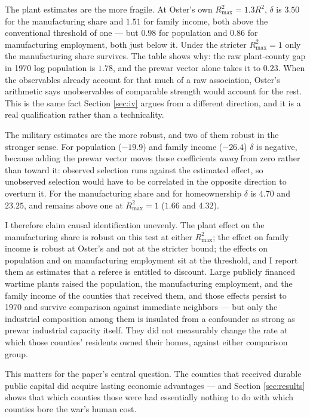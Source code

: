 \documentclass[12pt]{article}
\begin{document}
The plant estimates are the more fragile. At Oster's own $R^2_{\max}=1.3R^2$,
$\delta$ is $3.50$ for the manufacturing share and $1.51$ for family income,
both above the conventional threshold of one --- but $0.98$ for population and
$0.86$ for manufacturing employment, both just below it. Under the stricter
$R^2_{\max}=1$ only the manufacturing share survives. The table shows why: the
raw plant-county gap in 1970 log population is $1.78$, and the prewar vector
alone takes it to $0.23$. When the observables already account for that much of
a raw association, Oster's arithmetic says unobservables of comparable strength
would account for the rest. This is the same fact Section \ref{sec:iv} argues
from a different direction, and it is a real qualification rather than a
technicality.

The military estimates are the more robust, and two of them robust in the
stronger sense. For population ($-19.9$) and family income ($-26.4$) $\delta$ is
negative, because adding the prewar vector moves those coefficients \emph{away}
from zero rather than toward it: observed selection runs against the estimated
effect, so unobserved selection would have to be correlated in the opposite
direction to overturn it. For the manufacturing share and for homeownership
$\delta$ is $4.70$ and $23.25$, and remains above one at $R^2_{\max}=1$ ($1.66$
and $4.32$).

I therefore claim causal identification unevenly. The plant effect on the
manufacturing share is robust on this test at either $R^2_{\max}$; the effect on
family income is robust at Oster's and not at the stricter bound; the effects on
population and on manufacturing employment sit at the threshold, and I report
them as estimates that a referee is entitled to discount. Large publicly
financed wartime plants raised the population, the manufacturing employment, and
the family income of the counties that received them, and those effects persist
to 1970 and survive comparison against immediate neighbors --- but only the
industrial composition among them is insulated from a confounder as strong as
prewar industrial capacity itself. They did not measurably change the rate at
which those counties' residents owned their homes, against either comparison
group.

This matters for the paper's central question. The counties that received
durable public capital did acquire lasting economic advantages --- and Section
\ref{sec:results} shows that which counties those were had essentially nothing
to do with which counties bore the war's human cost.
\end{document}
